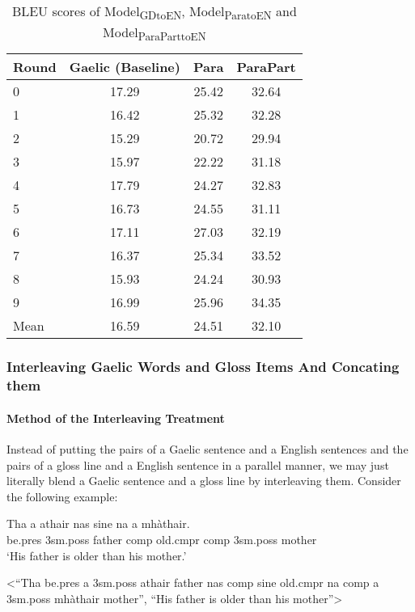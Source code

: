 \documentclass[a4paper]{article}
\begin{document}
\begin{table}[ht]
\centering
\begin{tabular}{lccc}
  \hline
Round & Gaelic (Baseline) & Para & ParaPart \\ 
  \hline
0 & 17.29 & 25.42 & 32.64 \\ 
  1 & 16.42 & 25.32 & 32.28 \\ 
  2 & 15.29 & 20.72 & 29.94 \\ 
  3 & 15.97 & 22.22 & 31.18 \\ 
  4 & 17.79 & 24.27 & 32.83 \\ 
  5 & 16.73 & 24.55 & 31.11 \\ 
  6 & 17.11 & 27.03 & 32.19 \\ 
  7 & 16.37 & 25.34 & 33.52 \\ 
  8 & 15.93 & 24.24 & 30.93 \\ 
  9 & 16.99 & 25.96 & 34.35 \\ 
   \hline
Mean & 16.59 & 24.51 & 32.10 \\ 
   \hline
\end{tabular}
\caption{BLEU scores of Model\textsubscript{GDtoEN}, Model\textsubscript{ParatoEN} and Model\textsubscript{ParaParttoEN} } 
\label{Table:Concating}
\end{table}
\subsubsection{Interleaving Gaelic Words and Gloss Items And Concating them}\label{treatment:InterleavingAndConCat}
\paragraph{Method of the Interleaving Treatment}
Instead of putting the pairs of a Gaelic sentence and a English sentences and the pairs of a gloss line and a English sentence in a parallel manner, we may just literally blend a Gaelic sentence and a gloss line by interleaving them. Consider the following example:

\begin{exe} 
\ex 
	\begin{xlist}
	\ex \label{ex_interleave:in}
		\gll	 Tha a athair nas sine na a mh\`athair.\\  
     		     be.pres 3sm.poss father comp old.cmpr comp 3sm.poss mother \\
    	\glt    `His father is older than his mother.'  

    \ex \label{ex_interleave:out} <``Tha be.pres a 3sm.poss athair father nas comp sine old.cmpr na comp a 3sm.poss mh\`athair mother'', ``His father is older than his mother''>
    \end{xlist}
\end{exe}
\end{document}
